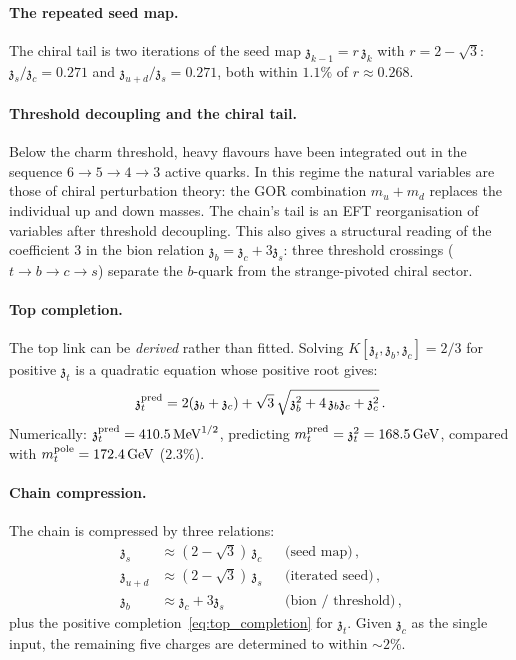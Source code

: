 \documentclass[12pt,a4paper]{article}
\newcommand{\MeV}{\,\mathrm{MeV}}
\newcommand{\GeV}{\,\mathrm{GeV}}
\newcommand{\zch}{\mathfrak{z}}
\begin{document}
\paragraph{The repeated seed map.}
The chiral tail is two iterations of the seed map
$\zch_{k-1} = r\,\zch_k$ with $r = 2 - \sqrt{3}$:
$\zch_s/\zch_c = 0.271$ and $\zch_{u+d}/\zch_s = 0.271$,
both within $1.1\%$ of $r \approx 0.268$.

\paragraph{Threshold decoupling and the chiral tail.}
Below the charm threshold, heavy flavours have been integrated out
in the sequence $6 \to 5 \to 4 \to 3$ active quarks.
In this regime the natural variables are those of chiral
perturbation theory: the GOR combination
$m_u + m_d$ replaces the individual up and down masses.
The chain's tail is an EFT reorganisation of variables after
threshold decoupling.
This also gives a structural reading of the coefficient 3 in the
bion relation $\zch_b = \zch_c + 3\zch_s$: three threshold
crossings ($t \to b \to c \to s$) separate the $b$-quark from
the strange-pivoted chiral sector.

\paragraph{Top completion.}
The top link can be \emph{derived} rather than fitted.
Solving $K[\zch_t, \zch_b, \zch_c] = 2/3$ for positive $\zch_t$
is a quadratic equation whose positive root gives:
\begin{equation}
  \zch_t^{\rm pred} = 2(\zch_b + \zch_c)
  + \sqrt{3}\,\sqrt{\zch_b^2 + 4\,\zch_b\zch_c + \zch_c^2}\,.
  \label{eq:top_completion}
\end{equation}
Numerically: $\zch_t^{\rm pred} = 410.5\MeV^{1/2}$, predicting
$m_t^{\rm pred} = \zch_t^2 = 168.5\GeV$, compared with
$m_t^{\rm pole} = 172.4\GeV$ ($2.3\%$).

\paragraph{Chain compression.}
The chain is compressed by three relations:
\begin{align}
  \zch_s &\approx (2-\sqrt{3})\,\zch_c
    &&\text{(seed map)}\,,\nonumber\\
  \zch_{u+d} &\approx (2-\sqrt{3})\,\zch_s
    &&\text{(iterated seed)}\,,\nonumber\\
  \zch_b &\approx \zch_c + 3\zch_s
    &&\text{(bion / threshold)}\,,
  \label{eq:chain_compression}
\end{align}
plus the positive completion~\eqref{eq:top_completion} for
$\zch_t$.
Given $\zch_c$ as the single input, the remaining five charges
are determined to within $\sim\!2\%$.
\end{document}
